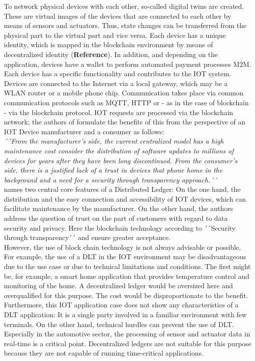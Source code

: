 \documentclass[conference]{IEEEtran}
\begin{document}
To network physical devices with each other, so-called digital twins are created. These are virtual images of the devices that are connected to each other by means of sensors and actuators. Thus, state changes can be transferred from the physical part to the virtual part and vice versa. Each device has a unique identity, which is mapped in the blockchain environment by means of decentralized identity (\textbf{Reference}). In addition, and depending on the application, devices have a wallet to perform automated payment processes M2M. Each device has a specific functionality and contributes to the IOT system. Devices are connected to the Internet via a local gateway, which may be a WLAN router or a mobile phone chip. Communication takes place via common communication protocols such as MQTT, HTTP or - as in the case of blockchain - via the blockchain protocol. IOT requests are processed via the blockchain network; the authors of \cite{SCIOT2016} formulate the benefits of this from the perspective of an IOT Device manufacturer and a consumer as follows:\\
\textit{´´From the manufacturer's side, the current centralized model has a high maintenance cost consider the distribution of software updates to millions of devices for years after they have been long discontinued. From the consumer's side, there is a justified lack of a trust in devices that phone home in the background and a need for a security through transparency approach.´´}\\
\cite{SCIOT2016} names two central core features of a Distributed Ledger: On the one hand, the distribution and the easy connection and accessibility of IOT devices, which can facilitate maintenance by the manufacturer. On the other hand, the authors address the question of trust on the part of customers with regard to data security and privacy. Here the blockchain technology according to \cite{SCIOT2016} ´´Security through transparency´´ and ensure greater acceptance.\\
However, the use of block chain technology is not always advisable or possible. For example, the use of a DLT in the IOT environment may be disadvantageous due to the use case or due to technical limitations and conditions. The first might be, for example, a smart home application that provides temperature control and monitoring of the home. A decentralized ledger would be oversized here and overqualified for this purpose. The cost would be disproportionate to the benefit. Furthermore, this IOT application case does not show any characteristics of a DLT application: It is a single party involved in a familiar environment with few terminals. On the other hand, technical hurdles can prevent the use of DLT. Especially in the automotive sector, the processing of sensor and actuator data in real-time is a critical point. Decentralized ledgers are not suitable for this purpose because they are not capable of running time-critical applications.\\
\end{document}
